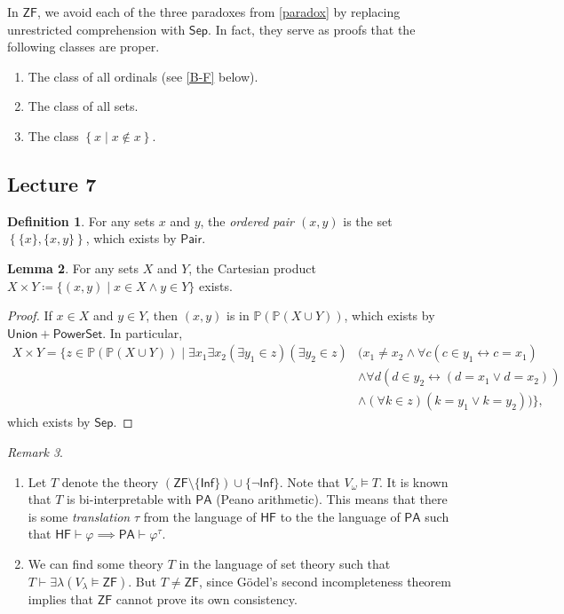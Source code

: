 \documentclass[10pt,letterpaper,cm]{nupset}
\theoremstyle{definition}
\newtheorem{definition}{Definition}[subsection]
\theoremstyle{theorem}
\newtheorem{lemma}[definition]{Lemma}
\theoremstyle{remark}
\newtheorem{remark}[definition]{Remark}
\renewcommand{\P}{\mathbb P}
\newcommand{\1}{\mathbf{1}}
\newcommand{\0}{\vec 0}
\newcommand{\zf}{\mathsf{ZF}}
\begin{document}
\medskip

In $\zf$, we avoid each of the three paradoxes from \cref{paradox} by replacing unrestricted comprehension with $\mathsf{Sep}$. In fact, they serve as proofs that the following classes are proper. 
\begin{enumerate}
\item The class of all ordinals (see \cref{B-F} below).
 \item The class of all sets.
 \item The class $\left\{x \mid x \notin x\right\}$.
 \end{enumerate}


\subsection{Lecture 7}

\begin{definition}
For any sets $x$ and $y$, the \textit{ordered pair $\left(x,y\right)$} is the set $\left\{\{x\}, \{x,y\}\right\}$, which exists by $\mathsf{Pair}$.
\end{definition}

\begin{lemma}
 For any sets $X$ and $Y$, the Cartesian product $X \times Y \coloneqq \{\left(x,y\right) \mid x \in X \land y \in Y\}$ exists.
\end{lemma}
\begin{proof}
If $x\in X$ and $y\in Y$, then $\left(x,y\right)$ is in $\P(\P(X \cup Y))$, which exists by $\mathsf{Union} + \mathsf{PowerSet}$. In particular,
\begin{align*}
X \times Y = \{z \in \P(\P(X \cup Y)) \mid 
\exists x_1 \exists x_2 (\exists y_1\in z)(\exists y_2\in z) &
 (x_1\ne x_2 \land \forall c (c\in y_1 \leftrightarrow c=x_1) 
\\ & \land \forall d(d\in y_2 \leftrightarrow (d = x_1 \vee d=x_2))
\\  & \land (\forall k\in z)(k = y_1 \vee k = y_2))   \}
,\end{align*}
which exists by $\mathsf{Sep}$. 
\end{proof}

\begin{remark} $ $
\begin{enumerate}
\item Let $T$ denote the theory $\left(\zf \setminus \{\mathsf{Inf}\}\right)\cup \{\neg{\mathsf{Inf}}\}$. Note that $V_{\omega} \models T$. It is known that $T$ is bi-interpretable with $\mathsf{PA}$ (Peano arithmetic).  This means that there is some \textit{translation} $\tau$ from the language of $\mathsf{HF}$ to the the language of $\mathsf{PA}$ such that $\mathsf{HF} \vdash \varphi \implies \mathsf{PA} \vdash \varphi^{\tau}$.
\item We can find some theory $T$ in the language of set theory such that $T \vdash \exists \lambda(V_{\lambda}\models \zf)$. But $T \ne \zf$, since G\"odel's second incompleteness theorem implies that $\zf$ cannot prove its own consistency. 
\end{enumerate}
\end{remark}
\end{document}
